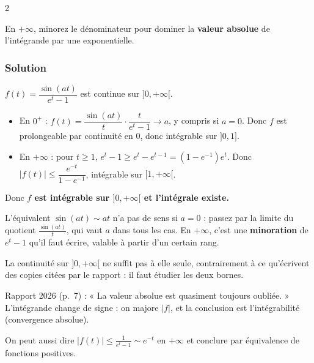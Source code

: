 \documentclass[11pt,a4paper]{article}
\providecommand{\tightlist}{\setlength{\itemsep}{0pt}\setlength{\parskip}{0pt}}
\begin{document}
\begin{indication}{2}

En \(+\infty\), minorez le dénominateur pour dominer la \textbf{valeur absolue} de l'intégrande par une exponentielle.

\end{indication}

\hypertarget{solution-12}{%
\subsubsection{Solution}\label{solution-12}}

\(f(t)=\dfrac{\sin(at)}{e^t-1}\) est continue sur \(]0,+\infty[\).

\begin{itemize}
\tightlist
\item
  En \(0^+\) : \(f(t)=\dfrac{\sin(at)}{t}\cdot\dfrac{t}{e^t-1}\to a\), y compris si \(a=0\). Donc \(f\) est prolongeable par continuité en \(0\), donc intégrable sur \(]0,1]\).
\item
  En \(+\infty\) : pour \(t\ge 1\), \(e^t-1\ge e^t-e^{t-1}=(1-e^{-1})e^t\). Donc \(|f(t)|\le\dfrac{e^{-t}}{1-e^{-1}}\), intégrable sur \([1,+\infty[\).
\end{itemize}

Donc \textbf{\(f\) est intégrable sur \(]0,+\infty[\) et l'intégrale existe.}

\begin{piege}

L'équivalent \(\sin(at)\sim at\) n'a pas de sens si \(a=0\) : passez par la limite du quotient \(\frac{\sin(at)}{t}\), qui vaut \(a\) dans tous les cas. En \(+\infty\), c'est une \textbf{minoration} de \(e^t-1\) qu'il faut écrire, valable à partir d'un certain rang.

La continuité sur \(]0,+\infty[\) ne suffit pas à elle seule, contrairement à ce qu'écrivent des copies citées par le rapport : il faut étudier les deux bornes.

\end{piege}

\begin{jury}

Rapport 2026 (p.~7) : « La valeur absolue est quasiment toujours oubliée. » L'intégrande change de signe : on majore \(|f|\), et la conclusion est l'intégrabilité (convergence absolue).

\end{jury}

\begin{methode}

On peut aussi dire \(|f(t)|\le\frac1{e^t-1}\sim e^{-t}\) en \(+\infty\) et conclure par équivalence de fonctions positives.

\end{methode}
\end{document}
